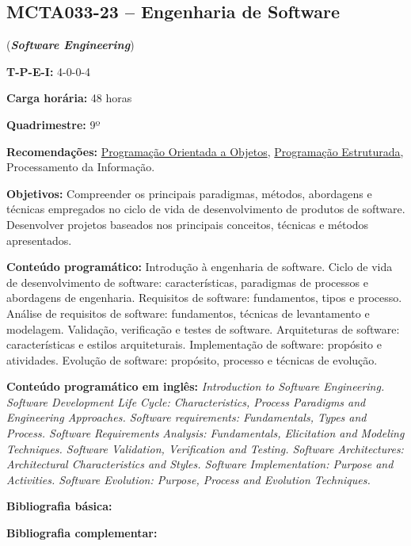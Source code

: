 \documentclass[12pt,a4paper]{article}
\begin{document}
\subsection{MCTA033-23 -- Engenharia de Software}
\label{disc:es}

(\textbf{\textit{Software Engineering}})

\begin{center}
    \begin{minipage}{0.85\textwidth}
    
        \textbf{T-P-E-I:} 4-0-0-4
    
        \textbf{Carga horária:} 48 horas
        
        \textbf{Quadrimestre:} 9º 
        
        \textbf{Recomendações:} 
        \hyperref[disc:poo]{Programação Orientada a Objetos},
        \hyperref[disc:pe]{Programação Estruturada},
        Processamento da Informação.
        
    \end{minipage}
\end{center}

\textbf{Objetivos:}
Compreender os principais paradigmas, métodos, abordagens e técnicas empregados
no ciclo de vida de desenvolvimento de produtos de software. Desenvolver
projetos baseados nos principais conceitos, técnicas e métodos apresentados.

\textbf{Conteúdo programático:}
Introdução à engenharia de software.
Ciclo de vida de desenvolvimento de software: características, paradigmas de
processos e abordagens de engenharia.
Requisitos de software: fundamentos, tipos e processo.
Análise de requisitos de software: fundamentos, técnicas de levantamento e modelagem.
Validação, verificação e testes de software.
Arquiteturas de software: características e estilos arquiteturais.
Implementação de software: propósito e atividades.
Evolução de software: propósito, processo e técnicas de evolução. 

\textbf{Conteúdo programático em inglês:}
\textit{Introduction to Software Engineering. 
Software Development Life Cycle: Characteristics, Process Paradigms and Engineering Approaches. 
Software requirements: Fundamentals, Types and Process. 
Software Requirements Analysis: Fundamentals, Elicitation and Modeling Techniques. 
Software Validation, Verification and Testing. 
Software Architectures: Architectural Characteristics and Styles. 
Software Implementation: Purpose and Activities. 
Software Evolution: Purpose, Process and Evolution Techniques.}

\newrefsection
\textbf{Bibliografia básica:}
\nocite{2011-sommerville, 2020-valente, 2014-teles} 
\printbibliography

\newrefsection
\textbf{Bibliografia complementar:}
\nocite{2004-ambler, 2002-ambler, 2013-beck, 2004-fowler,  2009-martin}
\printbibliography
\end{document}
